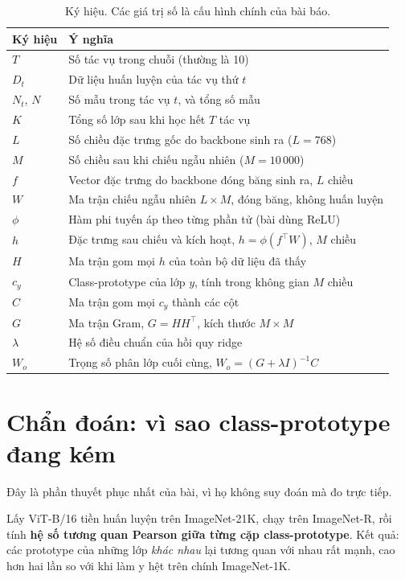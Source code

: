 \documentclass[11pt,a4paper]{article}
\begin{document}
\begin{table}[htbp]
\centering
\caption{Ký hiệu. Các giá trị số là cấu hình chính của bài báo.}
\label{tab:kyhieu}
\begin{tabular}{lM}
\toprule
Ký hiệu & Ý nghĩa \\
\midrule
$T$        & Số tác vụ trong chuỗi (thường là 10) \\
$D_t$      & Dữ liệu huấn luyện của tác vụ thứ $t$ \\
$N_t$, $N$ & Số mẫu trong tác vụ $t$, và tổng số mẫu \\
$K$        & Tổng số lớp sau khi học hết $T$ tác vụ \\
$L$        & Số chiều đặc trưng gốc do backbone sinh ra ($L = 768$) \\
$M$        & Số chiều sau khi chiếu ngẫu nhiên ($M = 10\,000$) \\
$f$        & Vector đặc trưng do backbone đóng băng sinh ra, $L$ chiều \\
$W$        & Ma trận chiếu ngẫu nhiên $L \times M$, đóng băng, không huấn luyện \\
$\phi$     & Hàm phi tuyến áp theo từng phần tử (bài dùng ReLU) \\
$h$        & Đặc trưng sau chiếu và kích hoạt, $h = \phi(f^{\top}W)$, $M$ chiều \\
$H$        & Ma trận gom mọi $h$ của toàn bộ dữ liệu đã thấy \\
$c_y$      & Class-prototype của lớp $y$, tính trong không gian $M$ chiều \\
$C$        & Ma trận gom mọi $c_y$ thành các cột \\
$G$        & Ma trận Gram, $G = HH^{\top}$, kích thước $M \times M$ \\
$\lambda$  & Hệ số điều chuẩn của hồi quy ridge \\
$W_o$      & Trọng số phân lớp cuối cùng, $W_o = (G + \lambda I)^{-1}C$ \\
\bottomrule
\end{tabular}
\end{table}

\section{Chẩn đoán: vì sao class-prototype đang kém}

Đây là phần thuyết phục nhất của bài, vì họ không suy đoán mà đo trực tiếp.

Lấy ViT-B/16 tiền huấn luyện trên ImageNet-21K, chạy trên ImageNet-R, rồi tính
\textbf{hệ số tương quan Pearson giữa từng cặp class-prototype}. Kết quả: các
prototype của những lớp \emph{khác nhau} lại tương quan với nhau rất mạnh, cao
hơn hai lần so với khi làm y hệt trên chính ImageNet-1K.
\end{document}
